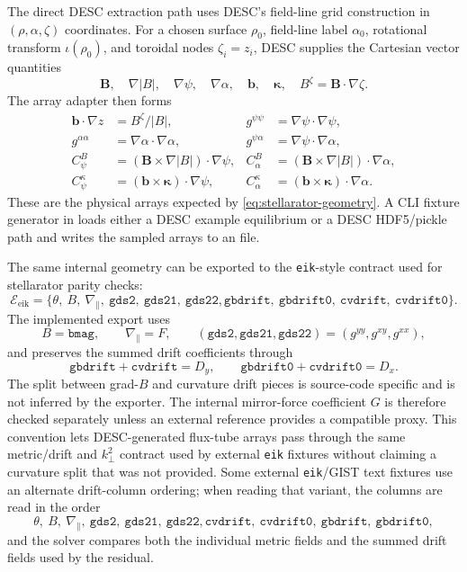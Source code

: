 \documentclass[11pt,a4paper]{article}
\newcommand{\kperp}{k_{\perp}}
\newcommand{\bvec}{\bm b}
\newcommand{\Bvec}{\bm B}
\newcommand{\grad}{\nabla}
\begin{document}
The direct DESC extraction path uses DESC's field-line grid construction in
\((\rho,\alpha,\zeta)\) coordinates.  For a chosen surface \(\rho_0\), field-line
label \(\alpha_0\), rotational transform \(\iota(\rho_0)\), and toroidal nodes
\(\zeta_i=z_i\), DESC supplies the Cartesian vector quantities
\[
  \Bvec,\quad \grad |B|,\quad \grad\psi,\quad \grad\alpha,\quad
  \bvec,\quad \bm\kappa,
  \quad B^\zeta=\Bvec\cdot\grad\zeta.
\]
The array adapter then forms
\begin{align}
  \bvec\cdot\grad z &= B^\zeta/|B|, &
  g^{\psi\psi} &= \grad\psi\cdot\grad\psi, \\
  g^{\alpha\alpha} &= \grad\alpha\cdot\grad\alpha, &
  g^{\psi\alpha} &= \grad\psi\cdot\grad\alpha, \\
  C_\psi^B &= (\Bvec\times\grad |B|)\cdot\grad\psi, &
  C_\alpha^B &= (\Bvec\times\grad |B|)\cdot\grad\alpha, \\
  C_\psi^\kappa &= (\bvec\times\bm\kappa)\cdot\grad\psi, &
  C_\alpha^\kappa &= (\bvec\times\bm\kappa)\cdot\grad\alpha.
  \label{eq:desc-array-contractions}
\end{align}
These are the physical arrays expected by \eqref{eq:stellarator-geometry}.
A CLI fixture generator in  loads either a DESC example
equilibrium or a DESC HDF5/pickle path and writes the sampled arrays to an
 file.

The same internal geometry can be exported to the \texttt{eik}-style
contract used for stellarator parity checks:
\begin{equation}
  \mathcal{E}_{\mathrm{eik}}
  =
  \{
    \theta,\ B,\ \grad_\parallel,\ \mathtt{gds2},\ \mathtt{gds21},\ \mathtt{gds22},
    \mathtt{gbdrift},\ \mathtt{gbdrift0},\ \mathtt{cvdrift},\ \mathtt{cvdrift0}
  \}.
  \label{eq:eik-export-contract}
\end{equation}
The implemented export uses
\[
  B=\mathtt{bmag},\qquad
  \grad_\parallel=F,\qquad
  (\mathtt{gds2},\mathtt{gds21},\mathtt{gds22})=(g^{yy},g^{xy},g^{xx}),
\]
and preserves the summed drift coefficients through
\[
  \mathtt{gbdrift}+\mathtt{cvdrift}=D_y,\qquad
  \mathtt{gbdrift0}+\mathtt{cvdrift0}=D_x.
\]
The split between grad-\(B\) and curvature drift pieces is source-code
specific and is not inferred by the exporter.  The internal mirror-force
coefficient \(G\) is therefore checked separately unless an external reference
provides a compatible proxy.  This convention lets DESC-generated flux-tube
arrays pass through the same metric/drift and \(\kperp^2\) contract used by
external \texttt{eik} fixtures without claiming a curvature split that was not
provided.
Some external \texttt{eik}/GIST text fixtures use an alternate drift-column
ordering; when reading that variant, the columns are read in the order
\[
  \theta,\ B,\ \grad_\parallel,\ \mathtt{gds2},\ \mathtt{gds21},\ \mathtt{gds22},
  \mathtt{cvdrift},\ \mathtt{cvdrift0},\ \mathtt{gbdrift},\ \mathtt{gbdrift0},
\]
and the solver compares both the individual metric fields and the summed drift
fields used by the residual.
\end{document}

